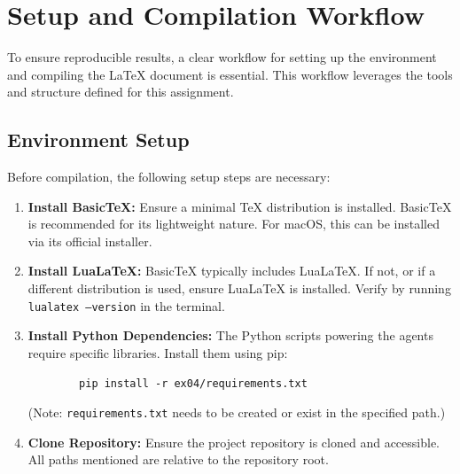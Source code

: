 \documentclass{custom-academic-template}
\begin{document}
\section{Setup and Compilation Workflow}
To ensure reproducible results, a clear workflow for setting up the environment and compiling the LaTeX document is essential. This workflow leverages the tools and structure defined for this assignment.

\subsection{Environment Setup}
Before compilation, the following setup steps are necessary:
\begin{enumerate}
    \item 	\textbf{Install BasicTeX:} Ensure a minimal TeX distribution is installed. BasicTeX is recommended for its lightweight nature. For macOS, this can be installed via its official installer.
    \item 	\textbf{Install LuaLaTeX:} BasicTeX typically includes LuaLaTeX. If not, or if a different distribution is used, ensure LuaLaTeX is installed. Verify by running 	\texttt{lualatex --version} in the terminal.
    \item 	\textbf{Install Python Dependencies:} The Python scripts powering the agents require specific libraries. Install them using pip:
        \begin{verbatim}
        pip install -r ex04/requirements.txt
        \end{verbatim}
        (Note: 	\texttt{requirements.txt} needs to be created or exist in the specified path.)
    \item 	\textbf{Clone Repository:} Ensure the project repository is cloned and accessible. All paths mentioned are relative to the repository root.
\end{enumerate}
\end{document}
